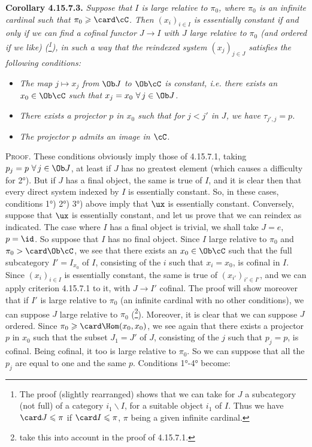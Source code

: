 \textbf{Corollary 4.15.7.3.} \textit{Suppose that $I$ is large relative to $\pi_0$, where $\pi_0$ is an infinite cardinal such that $\pi_0 \geqslant \card \cC$. Then $(x_i)_{i\in I}$ is essentially constant if and only if we can find a cofinal functor $J \longrightarrow I$ with $J$ large relative to $\pi_0$ (and ordered if we like) (\footnote{The proof (slightly rearranged) shows that we can take for $J$ a subcategory (not full) of a category $i_1\backslash I$, for a suitable object $i_1$ of $I$. Thus we have $\card J \leqslant \pi$ if $\card I \leqslant \pi$, $\pi$ being a given infinite cardinal.}), in such a way that the reindexed system $(x_j)_{j\in J}$ satisfies the following conditions:}
\begin{itemize}
\item[\textit{1°)}] \textit{The map $j \longmapsto x_j$ from $\Ob J$ to $\Ob\cC$ is constant, i.e. there exists an $x_0 \in \Ob\cC$ such that $x_j = x_0\ \forall\, j \in \Ob J$.}
\item[\textit{2°)}] \textit{There exists a projector $p$ in $x_0$ such that for $j < j'$ in $J$, we have $\tau_{j',j} = p$.}
\item[\textit{3°)}] \textit{The projector $p$ admits an image in $\cC$.}
\end{itemize}
\textsc{Proof}. These conditions obviously imply those of 4.15.7.1, taking $p_j = p\ \forall\, j \in \Ob J$, at least if $J$ has no greatest element (which causes a difficulty for 2°). But if $J$ has a final object, the same is true of $I$, and it is clear then that every direct system indexed by $I$ is essentially constant. So, in these cases, conditions 1°) 2°) 3°) above imply that $\ux$ is essentially constant. Conversely, suppose that $\ux$ is essentially constant, and let us prove that we can reindex as indicated. The case where $I$ has a final object is trivial, we shall take $J = e$, $p = \id$. So suppose that $I$ has no final object. Since $I$ large relative to $\pi_0$ and $\pi_0 > \card\Ob\cC$, we see that there exists an $x_0 \in \Ob\cC$ such that the full subcategory $I' = I_{x_0}$ of $I$, consisting of the $i$ such that $x_i = x_0$, is cofinal in $I$. Since $(x_i)_{i\in I}$ is essentially constant, the same is true of $(x_{i'})_{i'\in I'}$, and we can apply criterion 4.15.7.1 to it, with \marginpar{$\Vert$}%
$J \longrightarrow I'$ cofinal. The proof will show moreover that if $I'$ is large relative to $\pi_0$ (an infinite cardinal with no other conditions), we can suppose $J$ large relative to $\pi_0$ (\footnote{take this into account in the proof of 4.15.7.1.}). Moreover, it is clear that we can suppose $J$ ordered. Since $\pi_0 \geqslant \card\Hom(x_0,x_0)$, we see again that there exists a projector $p$ in $x_0$ such that the subset $J_1 = J'$ of $J$, consisting of the $j$ such that $p_j = p$, is cofinal. Being cofinal, it too is large relative to $\pi_0$. So we can suppose that all the $p_j$ are equal to one and the same $p$. Conditions 1°-4° become:
